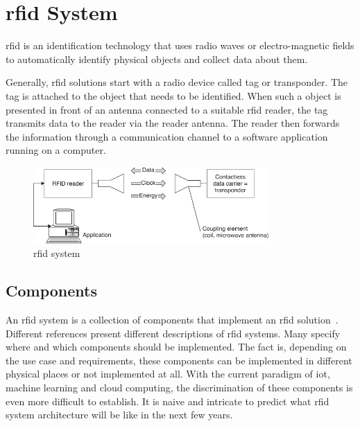 \section{\ac{rfid} System}


\ac{rfid} is an identification technology that uses radio waves or electro-magnetic fields to automatically identify physical objects and collect data about them.

Generally, \ac{rfid} solutions start with a radio device called tag or transponder. The tag is attached to the object that needs to be identified. When such a object is presented in front of an antenna connected to a suitable \ac{rfid} reader, the tag transmits data to the reader via the reader antenna. The reader then forwards the information through a communication channel to a software application running on a computer.

\begin{figure}[]
    \centering
    \includegraphics[width=0.8\textwidth]{./figs/02-state-of-the-art/rfid_system.pdf}
    \caption[\ac{rfid} system]{\ac{rfid} system~\cite{finkenzellerRFIDHandbookFundamentals2003}}
    \label{fig:rfidsystem}
\end{figure}

\subsection{Components}

An \ac{rfid} system is a collection of components that implement an \ac{rfid} solution~\cite{lahiriRFIDSourcebook2005}.
Different references present different descriptions of \ac{rfid} systems. Many specify where and which components should be implemented.
The fact is, depending on the use case and requirements, these components can be implemented in different physical places or not implemented at all. With the current paradigm of \ac{iot}, machine learning and cloud computing, the discrimination of these components is even more difficult to establish. It is naive and intricate to predict what \ac{rfid} system architecture will be like in the next few years.


